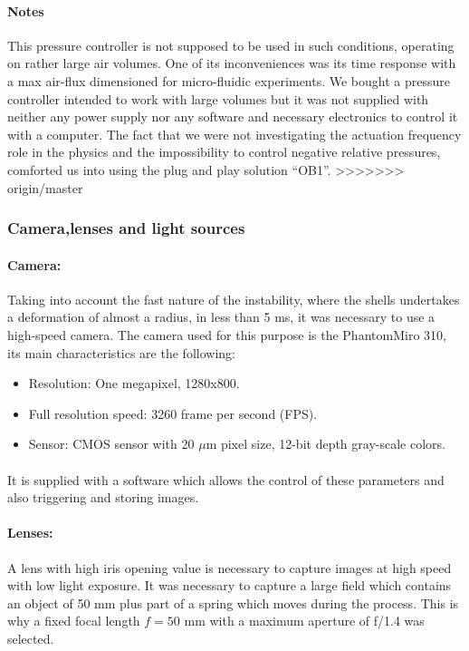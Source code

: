 \paragraph{Notes}
This pressure controller is not supposed to be used in such conditions, operating on rather large air volumes. One of its inconveniences was its time response with a max air-flux dimensioned for micro-fluidic experiments. We bought a pressure controller intended to work with large volumes but it was not supplied with neither any power supply nor any software and necessary electronics to control it with a computer. The fact that we were not investigating the actuation frequency role in the physics and the impossibility to control negative relative pressures, comforted us into using the plug and play solution "`OB1"'.
>>>>>>> origin/master

\subsubsection{Camera,lenses and light sources}
\label{sssection:CLLS}
\paragraph{Camera:}
Taking into account the fast nature of the instability, where the shells undertakes a deformation of almost a radius, in less than 5 ms, it was necessary to use a high-speed camera.
The camera used for this purpose is the Phantom\textcopyright Miro 310, its main characteristics are the following:
\begin{itemize}
	\item Resolution: One megapixel, 1280x800.
	\item Full resolution speed: 3260 frame per second (FPS).
	\item Sensor: CMOS sensor with 20 $\mu$m pixel size, 12-bit depth gray-scale colors.
\end{itemize}
\paragraph{}
It is supplied with a software which allows the control of these parameters and also triggering and storing images.
\paragraph{Lenses:}
A lens with high iris opening value is necessary to capture images at high speed with low light exposure. It was necessary to capture a large field which contains an object of 50 mm plus part of a spring which moves during the process. This is why a fixed focal length $f= 50$ mm with a maximum aperture of f/1.4 was selected.

